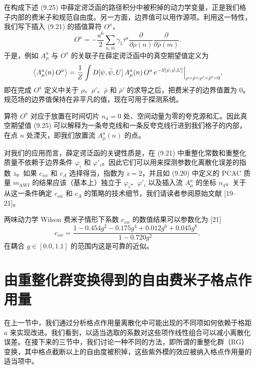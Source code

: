 在构成下述 (9.25) 中薛定谔泛函的路径积分中被积掉的动力学变量，正是我们格子内部的费米子和规范自由度。另一方面，边界值可以用作源项。利用这一特性，我们写下插入 (9.21) 的插值算符 $O^a$，
\begin{equation}
  O^a = -\frac{a^6}{2}\sum_{n,m}\gamma_5\tau^a
    \frac{\partial}{\partial\rho(n)}\frac{\partial}{\partial\bar\rho(m)} .
\end{equation}
于是，例如 $A^a_\mu$ 与 $O^a$ 的关联子在薛定谔泛函中的真空期望值定义为
\begin{equation}
  \left\langle A^a_\mu(n)\,O^a \right\rangle
  = \frac{1}{Z}\int D[\psi,\bar\psi,U]\,A^a_\mu(n)\,O^a\,e^{-S[\psi,\bar\psi,U]}
    \Big|_{\rho=\bar\rho=\rho'=\bar\rho'=0} ,
\end{equation}
即在完成 $O^a$ 定义中关于 $\rho$、$\rho'$、$\bar\rho$ 和 $\bar\rho'$ 的求导之后，把费米子的边界值置为 0。规范场的边界值保持在非平凡的值，现在可用于探测系统。

算符 $O^a$ 对应于放置在时间切片 $n_4 = 0$ 处、空间动量为零的夸克源和汇。因此真空期望值 (9.25) 可以解释为一条夸克线和一条反夸克线行进到我们格子的内部，在点 $n$ 处湮灭，即我们放置流 $A^a_\mu(n)$ 的点。

对我们的应用而言，薛定谔泛函的关键性质是，在 (9.21) 中重整化常数和重整化质量不依赖于边界条件 $\varphi_i$ 和 $\varphi'_i$。因此它们可以用来探测参数化离散化误差的指数 $z$。如果 $c_{sw}$ 和 $c_A$ 选择得当，指数为 $z = 2$，并且如 (9.20) 中定义的 PCAC 质量 $m_{\mathrm{AWI}}$ 的结果应该（基本上）独立于 $\varphi_i$、$\varphi'_i$ 以及插入流 $A^a_\mu$ 的坐标 $n_4$。关于从这一条件确定 $c_{sw}$ 和 $c_A$ 的策略的技术细节，我们请读者参阅原始文献 [19--21]。

两味动力学 Wilson 费米子情形下系数 $c_{sw}$ 的数值结果可以参数化为 [21]
\begin{equation}
  c_{sw} = \frac{1 - 0.454g^2 - 0.175g^4 + 0.012g^6 + 0.045g^8}{1 - 0.720g^2} ,
\end{equation}
在耦合 $g \in [0.0, 1.1]$ 的范围内这是可靠的近似。

\section{由重整化群变换得到的自由费米子格点作用量}
\label{sec:9.2}

在上一节中，我们通过分析格点作用量离散化中可能出现的不同项如何依赖于格距 $a$ 来实现改进。我们看到，以适当选取的系数对这些项作线性组合可以减小离散化误差。在接下来的三节中，我们讨论一种不同的方法，即所谓的重整化群（RG）变换，其中格点截断以上的自由度被积掉，这些紫外模的效应被纳入格点作用量的适当项中。

